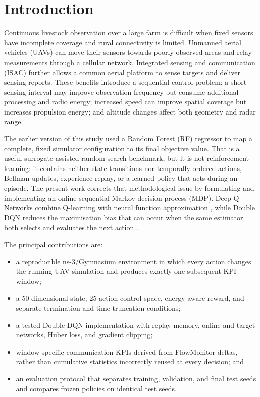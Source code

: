 \documentclass[10pt,conference]{IEEEtran}
\begin{document}
\section{Introduction}

Continuous livestock observation over a large farm is difficult when fixed
sensors have incomplete coverage and rural connectivity is limited. Unmanned
aerial vehicles (UAVs) can move their sensors towards poorly observed areas
and relay measurements through a cellular network. Integrated sensing and
communication (ISAC) further allows a common aerial platform to sense targets
and deliver sensing reports. These benefits introduce a sequential control
problem: a short sensing interval may improve observation frequency but consume
additional processing and radio energy; increased speed can improve spatial
coverage but increases propulsion energy; and altitude changes affect both
geometry and radar range.

The earlier version of this study used a Random Forest (RF) regressor to map a
complete, fixed simulator configuration to its final objective value. That is
a useful surrogate-assisted random-search benchmark, but it is not
reinforcement learning: it contains neither state transitions nor temporally
ordered actions, Bellman updates, experience replay, or a learned policy that
acts during an episode. The present work corrects that methodological issue by
formulating and implementing an online sequential Markov decision process
(MDP). Deep Q-Networks combine Q-learning with neural function approximation
\cite{mnih2015}, while Double DQN reduces the maximisation bias that can occur
when the same estimator both selects and evaluates the next action
\cite{hasselt2016}.

The principal contributions are:
\begin{itemize}
  \item a reproducible ns-3/Gymnasium environment in which every action changes
  the running UAV simulation and produces exactly one subsequent KPI window;
  \item a 50-dimensional state, 25-action control space, energy-aware reward,
  and separate termination and time-truncation conditions;
  \item a tested Double-DQN implementation with replay memory, online and
  target networks, Huber loss, and gradient clipping;
  \item window-specific communication KPIs derived from FlowMonitor deltas,
  rather than cumulative statistics incorrectly reused at every decision; and
  \item an evaluation protocol that separates training, validation, and final
  test seeds and compares frozen policies on identical test seeds.
\end{itemize}
\end{document}
